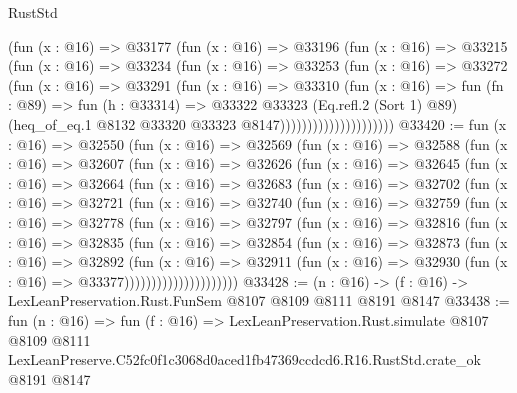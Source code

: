 \begin{lexlean}{RustStd}
\begin{coremodule}
                          (fun (x : @16) =>
                          @33177
                            (fun (x : @16) =>
                            @33196
                              (fun (x : @16) =>
                              @33215
                                (fun (x : @16) =>
                                @33234
                                  (fun (x : @16) =>
                                  @33253
                                    (fun (x : @16) =>
                                    @33272
                                      (fun (x : @16) =>
                                      @33291
                                        (fun (x : @16) =>
                                        @33310
                                          (fun (x : @16) =>
                                          fun (fn : @89) =>
                                          fun (h : @33314) =>
                                          @33322
                                            @33323
                                            (Eq.refl.{2} (Sort 1) @89)
                                            (heq_of_eq.{1}
                                              @8132
                                              @33320
                                              @33323
                                              @8147)))))))))))))))))))))
@33420 := fun (x : @16) =>
  @32550
    (fun (x : @16) =>
    @32569
      (fun (x : @16) =>
      @32588
        (fun (x : @16) =>
        @32607
          (fun (x : @16) =>
          @32626
            (fun (x : @16) =>
            @32645
              (fun (x : @16) =>
              @32664
                (fun (x : @16) =>
                @32683
                  (fun (x : @16) =>
                  @32702
                    (fun (x : @16) =>
                    @32721
                      (fun (x : @16) =>
                      @32740
                        (fun (x : @16) =>
                        @32759
                          (fun (x : @16) =>
                          @32778
                            (fun (x : @16) =>
                            @32797
                              (fun (x : @16) =>
                              @32816
                                (fun (x : @16) =>
                                @32835
                                  (fun (x : @16) =>
                                  @32854
                                    (fun (x : @16) =>
                                    @32873
                                      (fun (x : @16) =>
                                      @32892
                                        (fun (x : @16) =>
                                        @32911
                                          (fun (x : @16) =>
                                          @32930 (fun (x : @16) => @33377)))))))))))))))))))))
@33428 := (n : @16) -> (f : @16) -> LexLeanPreservation.Rust.FunSem @8107 @8109 @8111 @8191 @8147
@33438 := fun (n : @16) =>
  fun (f : @16) =>
  LexLeanPreservation.Rust.simulate
    @8107
    @8109
    @8111
    LexLeanPreserve.C52fc0f1c3068d0aced1fb47369ccdcd6.R16.RustStd.crate_ok
    @8191
    @8147
\end{coremodule}
\end{lexlean}
